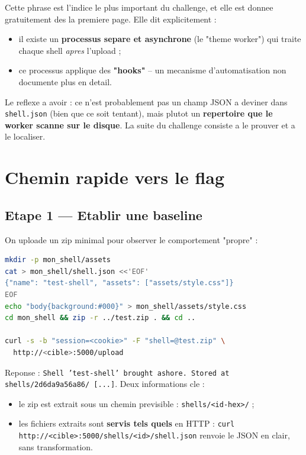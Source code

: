 \documentclass[11pt,a4paper]{article}
\begin{document}
\begin{keyinsight}
Cette phrase est l'indice le plus important du challenge, et elle est
donnee gratuitement des la premiere page. Elle dit explicitement :
\begin{itemize}
  \item il existe un \textbf{processus separe et asynchrone} (le
        "theme worker") qui traite chaque shell \emph{apres} l'upload ;
  \item ce processus applique des \textbf{"hooks"} -- un mecanisme
        d'automatisation non documente plus en detail.
\end{itemize}
Le reflexe a avoir : ce n'est probablement pas un champ JSON a deviner
dans \texttt{shell.json} (bien que ce soit tentant), mais plutot un
\textbf{repertoire que le worker scanne sur le disque}. La suite du
challenge consiste a le prouver et a le localiser.
\end{keyinsight}

\section{Chemin rapide vers le flag}

\subsection{Etape 1 --- Etablir une baseline}

On uploade un zip minimal pour observer le comportement "propre" :

\begin{lstlisting}[language=bash]
mkdir -p mon_shell/assets
cat > mon_shell/shell.json <<'EOF'
{"name": "test-shell", "assets": ["assets/style.css"]}
EOF
echo "body{background:#000}" > mon_shell/assets/style.css
cd mon_shell && zip -r ../test.zip . && cd ..

curl -s -b "session=<cookie>" -F "shell=@test.zip" \
  http://<cible>:5000/upload
\end{lstlisting}

Reponse : \texttt{Shell 'test-shell' brought ashore. Stored at
shells/2d6da9a56a86/ [...]}. Deux informations cle :

\begin{itemize}
  \item le zip est extrait sous un chemin previsible :
        \texttt{shells/<id-hex>/} ;
  \item les fichiers extraits sont \textbf{servis tels quels} en HTTP :
        \texttt{curl http://<cible>:5000/shells/<id>/shell.json} renvoie
        le JSON en clair, sans transformation.
\end{itemize}
\end{document}
